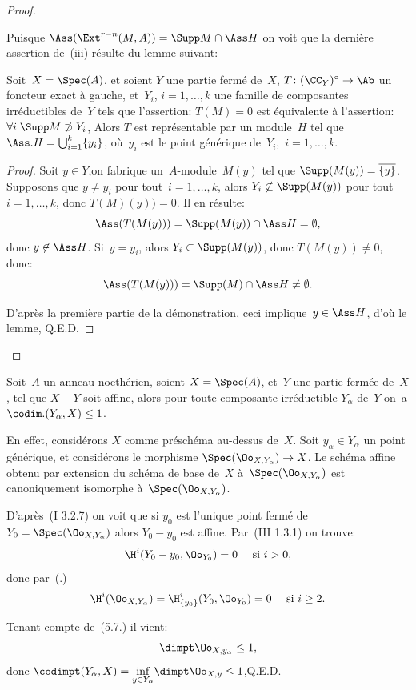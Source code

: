 \begin{proof}
\begin{enumeratei}
Puisque $\Ass(\Ext^{r-n}(M, A))=\Supp M\cap\Ass H$ on voit que la derni\`ere assertion de~(iii) r\'esulte du lemme suivant:
\end{enumeratei}

\begin{lemme} \label{V.3.3} Soit~$X=\Spec(A)$, et soient $Y$ une partie ferm\'e de~$X$, $T\colon (\CC_{Y})^{\circ}\to\Ab$ un foncteur exact \`a gauche, et~$Y_{i}$, $i=1,\dots, k$ une famille de composantes irr\'eductibles de~$Y$ tels que l'assertion: $T(M)=0$ est \'equivalente \`a l'assertion: $\forall i\;\Supp M\not\supset Y_{i}$, Alors $T$ est repr\'esentable par un module~$H$ tel que $\Ass.H=\bigcup_{i=1}^{k}\{y_{i}\}$, o\`u~$y_{i}$ est le point g\'en\'erique de~$Y_{i}$,~$i=1,\dots, k$.
\end{lemme}

\begin{proof}
Soit $y\in Y$,\pageoriginaled on fabrique un~$A$-module~$M(y)$ tel que $\Supp(M(y))=\overline{\{ y\} }$. Supposons que $y\neq y_{i}$ pour tout~$i=1,\dots, k$, alors $Y_{i}\not\subset\Supp(M(y))$ pour tout~$i=1,\dots, k$, donc $T(M)(y))=0$. Il en r\'esulte:
$$
\Ass(T(M(y)))=\Supp(M(y))\cap\Ass H=\emptyset,
$$
donc $y\not\in\Ass H$. Si~$y=y_{i}$, alors $Y_{i}\subset\Supp(M(y))$, donc $T(M(y))\neq 0$, donc:
$$
\Ass(T(M(y)))=\Supp(M)\cap\Ass H\neq\emptyset.
$$

D'apr\`es la premi\`ere partie de la d\'emonstration, ceci implique~$y\in\Ass H$, d'o\`u le lemme, \hfill Q.E.D.
\skipqed
\end{proof}
\skipqed
\end{proof}

\begin{exemple} \label{V.3.4}
Soit~$A$ un anneau noeth\'erien, soient $X=\Spec(A)$, et~$Y$ une partie ferm\'ee de~$X$, tel que $X-Y$ soit affine, alors pour toute composante irr\'eductible $Y_{\alpha}$ de~$Y$ on~a $\codim.(Y_{\alpha}, X)\leq 1$.

En effet, consid\'erons $X$ comme pr\'esch\'ema au-dessus de~$X$. Soit $y_{\alpha}\in Y_{\alpha}$ un point g\'en\'erique, et consid\'erons le morphisme $\Spec(\Oo_{X, Y_{\alpha}})\to X$. Le sch\'ema affine obtenu par extension du sch\'ema de base de~$X$ \`a~$\Spec(\Oo_{X, Y_{\alpha}})$ est canoniquement isomorphe \`a~$\Spec(\Oo_{X, Y_{\alpha}})$.

D'apr\`es~(\EGA I 3.2.7) on voit que si $y_{0}$ est l'unique point ferm\'e de~$Y_{0}=\Spec(\Oo_{X, Y_{\alpha}})$ alors $Y_{0}- y_{0}$ est affine. Par~(\EGA III 1.3.1) on trouve:
$$
\H^{i}(Y_{0}- y_{0}, \Oo_{Y_{0}})=0\quad\textrm{ si }i>0,
$$
donc par~(.)
$$
\H^{i}(\Oo_{X, Y_{\alpha}})=\H_{\{ y_{0}\} }^{i}(Y_{0}, \Oo_{Y_{0}})=0\quad\textrm{ si }i\geq 2.
$$

Tenant compte de~(5.7.) il vient:
$$
\dimpt \Oo_{X, y_{\alpha}}\leq 1,
$$
donc $\codimpt (Y_{\alpha}, X)=\underset{y\in Y_{\alpha}}{\inf}\dimpt \Oo_{X, y}\leq 1$,\hfill Q.E.D.
\end{exemple}

